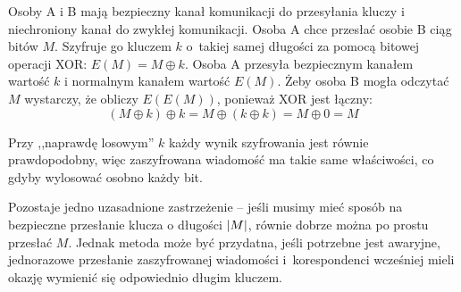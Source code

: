 Osoby A i B mają bezpieczny kanał komunikacji do przesyłania kluczy i niechroniony kanał do zwykłej komunikacji. Osoba A chce przesłać osobie B ciąg bitów \( M \).
Szyfruje go kluczem \( k \) o~takiej samej długości za pomocą bitowej operacji XOR: \( E(M) = M \oplus k \).
Osoba A przesyła bezpiecznym kanałem wartość \( k \) i normalnym kanałem wartość \( E(M) \). Żeby osoba B mogła odczytać \( M \) wystarczy, że obliczy \( E(E(M)) \), ponieważ XOR jest łączny:
\[
	(M \oplus k) \oplus k = M \oplus (k \oplus k)  = M \oplus 0 = M
\]

Przy ,,naprawdę losowym'' \( k \) każdy wynik szyfrowania jest równie prawdopodobny, więc zaszyfrowana wiadomość ma takie same właściwości, co gdyby wylosować osobno każdy bit.

Pozostaje jedno uzasadnione zastrzeżenie -- jeśli musimy mieć sposób na bezpieczne przesłanie klucza o długości \( \left\lvert M\right\rvert \), równie dobrze można po prostu przesłać \( M \).
Jednak metoda może być przydatna, jeśli potrzebne jest awaryjne, jednorazowe przesłanie zaszyfrowanej wiadomości i~korespondenci wcześniej mieli okazję wymienić się odpowiednio długim kluczem.
